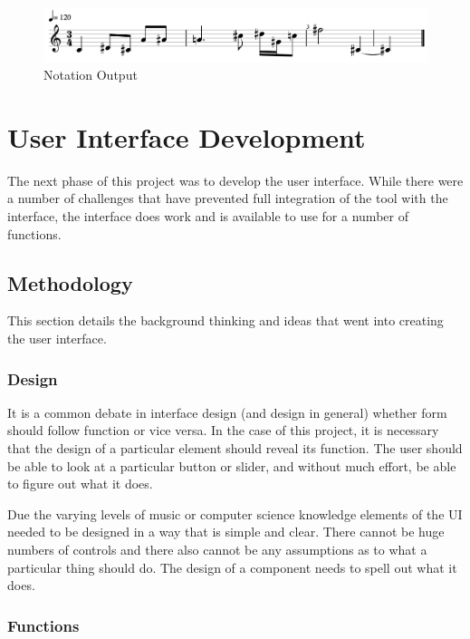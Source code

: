 \begin{figure}[!htbp]
	\centering
	\caption{Notation Output}
	\includegraphics[scale=0.4]{images/notation.png}
\end{figure}

\section{User Interface Development}
\label{sec:userinterfacedevelopment}

The next phase of this project was to develop the user interface.  While there were a number of challenges that have prevented full integration of the tool with the interface, the interface does work and is available to use for a number of functions.

\subsection{Methodology}
\label{subsec:methodology}

This section details the background thinking and ideas that went into creating the user interface.

\subsubsection{Design}
\label{subsubsec:methodologydesign}

It is a common debate in interface design (and design in general) whether form should follow function or vice versa.  In the case of this project, it is necessary that the design of a particular element should reveal its function.  The user should be able to look at a particular button or slider, and without much effort, be able to figure out what it does.

\vspace{\baselineskip}

Due the varying levels of music or computer science knowledge elements of the UI needed to be designed in a way that is simple and clear.  There cannot be huge numbers of controls and there also cannot be any assumptions as to what a particular thing should do.  The design of a component needs to spell out what it does.

\subsubsection{Functions}
\label{subsubsec:methodologyfunctions}

